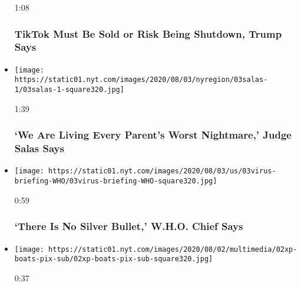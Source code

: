 \begin{itemize}
  1:08

  \hypertarget{tiktok-must-be-sold-or-risk-being-shutdown-trump-says}{%
  \subsubsection{TikTok Must Be Sold or Risk Being Shutdown, Trump
  Says}\label{tiktok-must-be-sold-or-risk-being-shutdown-trump-says}}
\item
  \href{https://www.nytimes.com/video/us/100000007269993/judge-salas-new-jersey.html?action=click\&module=video-series-bar\&region=header\&pgtype=Article\&playlistId=video/latest-video}{}

  \texttt{[image: https://static01.nyt.com/images/2020/08/03/nyregion/03salas-1/03salas-1-square320.jpg]}

  1:39

  \hypertarget{we-are-living-every-parents-worst-nightmare-judge-salas-says}{%
  \subsubsection{`We Are Living Every Parent's Worst Nightmare,' Judge
  Salas
  Says}\label{we-are-living-every-parents-worst-nightmare-judge-salas-says}}
\item
  \href{https://www.nytimes.com/video/world/europe/100000007269932/who-coronavirus-briefing.html?action=click\&module=video-series-bar\&region=header\&pgtype=Article\&playlistId=video/latest-video}{}

  \texttt{[image: https://static01.nyt.com/images/2020/08/03/us/03virus-briefing-WHO/03virus-briefing-WHO-square320.jpg]}

  0:59

  \hypertarget{there-is-no-silver-bullet-who-chief-says}{%
  \subsubsection{`There Is No Silver Bullet,' W.H.O. Chief
  Says}\label{there-is-no-silver-bullet-who-chief-says}}
\item
  \href{https://www.nytimes.com/video/us/100000007269193/boats-circle-spacex-capsule.html?action=click\&module=video-series-bar\&region=header\&pgtype=Article\&playlistId=video/latest-video}{}

  \texttt{[image: https://static01.nyt.com/images/2020/08/02/multimedia/02xp-boats-pix-sub/02xp-boats-pix-sub-square320.jpg]}

  0:37


\end{itemize}
